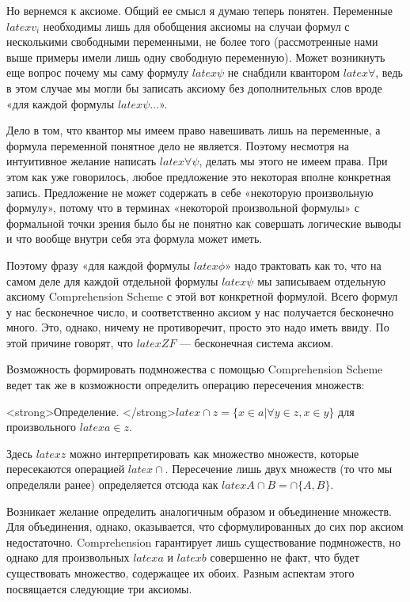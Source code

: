 Но вернемся к аксиоме. Общий ее смысл я думаю теперь понятен. Переменные $latex v_i$ необходимы лишь для обобщения аксиомы на случаи формул с несколькими свободными переменными, не более того (рассмотренные нами выше примеры имели лишь одну свободную переменную). Может возникнуть еще вопрос почему мы саму формулу $latex \psi$ не снабдили квантором $latex \forall$, ведь в этом случае мы могли бы записать аксиому без дополнительных слов вроде «для каждой формулы $latex \psi$...».

Дело в том, что квантор мы имеем право навешивать лишь на переменные, а формула переменной понятное дело не является. Поэтому несмотря на интуитивное желание написать $latex \forall\psi$, делать мы этого не имеем права. При этом как уже говорилось, любое предложение это некоторая вполне конкретная запись. Предложение не может содержать в себе «некоторую произвольную формулу», потому что в терминах «некоторой произвольной формулы» с формальной точки зрения было бы не понятно как совершать логические выводы и что вообще внутри себя эта формула может иметь.

Поэтому фразу «для каждой формулы $latex \phi$» надо трактовать как то, что на самом деле для каждой отдельной формулы $latex \psi$ мы записываем отдельную аксиому Comprehension Scheme с этой вот конкретной формулой. Всего формул у нас бесконечное число, и соответственно аксиом у нас получается бесконечно много. Это, однако, ничему не противоречит, просто это надо иметь ввиду. По этой причине говорят, что $latex ZF$ — бесконечная система аксиом.

Возможность формировать подмножества с помощью Comprehension Scheme ведет так же в козможности определить операцию пересечения множеств:

<strong>Определение. </strong>$latex \cap z = \{x \in a| \forall y \in z, x\in y\}$ для произвольного $latex a \in z$.

Здесь $latex z$ можно интерпретировать как множество множеств, которые пересекаются операцией $latex \cap$. Пересечение лишь двух множеств (то что мы определяли ранее) определяется отсюда как $latex A\cap B = \cap\{A, B\}$.

Возникает желание определить аналогичным образом и объединение множеств. Для объединения, однако, оказывается, что сформулированных до сих пор аксиом недостаточно. Comprehension гарантирует лишь существование подмножеств, но однако для произвольных $latex a$ и $latex b$ совершенно не факт, что будет существовать множество, содержащее их обоих. Разным аспектам этого посвящается следующие три аксиомы.

